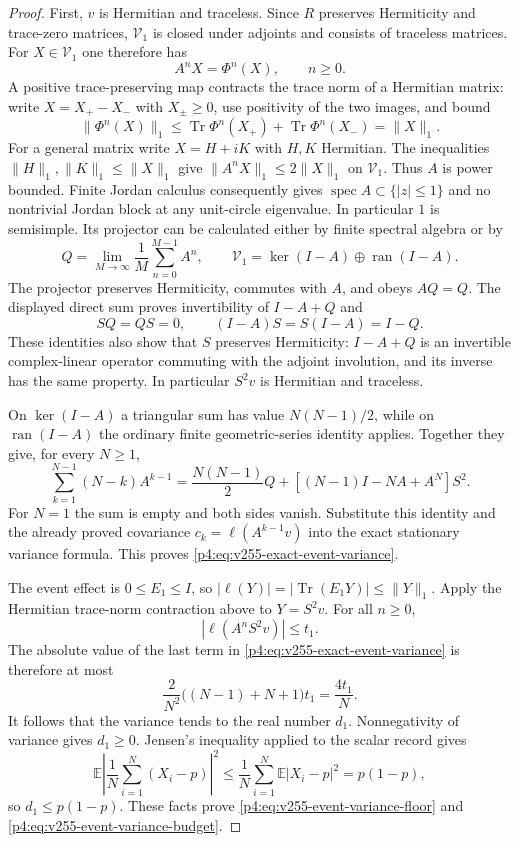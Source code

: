 \documentclass[12pt,a4paper]{article}
\begin{document}
\begin{proof}
First, $v$ is Hermitian and traceless. Since $R$ preserves Hermiticity
and trace-zero matrices, $\mathcal V_1$ is closed under adjoints and
consists of traceless matrices. For $X\in\mathcal V_1$ one therefore has
\[
 A^nX=\Phi^n(X),\qquad n\ge0.
\]
A positive trace-preserving map contracts the trace norm of a Hermitian
matrix: write $X=X_+-X_-$ with $X_\pm\ge0$, use positivity of the two
images, and bound
\[
 \|\Phi^n(X)\|_1
 \le\operatorname{Tr}\Phi^n(X_+)
      +\operatorname{Tr}\Phi^n(X_-)=\|X\|_1.
\]
For a general matrix write $X=H+iK$ with $H,K$ Hermitian. The inequalities
$\|H\|_1,\|K\|_1\le\|X\|_1$ give
$\|A^nX\|_1\le2\|X\|_1$ on $\mathcal V_1$.
Thus $A$ is power bounded. Finite Jordan calculus consequently gives
$\operatorname{spec}A\subset\{|z|\le1\}$ and no nontrivial Jordan
block at any unit-circle eigenvalue. In particular $1$ is semisimple.
Its projector can be calculated either by finite spectral algebra or by
\[
 Q=\lim_{M\to\infty}\frac1M\sum_{n=0}^{M-1}A^n,
 \qquad
 \mathcal V_1=\ker(I-A)\oplus\operatorname{ran}(I-A).
\]
The projector preserves Hermiticity, commutes with $A$, and obeys
$AQ=Q$. The displayed direct sum proves invertibility of $I-A+Q$ and
\[
 SQ=QS=0,\qquad (I-A)S=S(I-A)=I-Q.
\]
These identities also show that $S$ preserves Hermiticity: $I-A+Q$ is
an invertible complex-linear operator commuting with the adjoint
involution, and its inverse has the same property. In particular
$S^2v$ is Hermitian and traceless.

On $\ker(I-A)$ a triangular sum has value $N(N-1)/2$, while on
$\operatorname{ran}(I-A)$ the ordinary finite geometric-series identity
applies. Together they give, for every $N\ge1$,
\[
 \sum_{k=1}^{N-1}(N-k)A^{k-1}
 =\frac{N(N-1)}2Q+
       [(N-1)I-NA+A^N]S^2.
\]
For $N=1$ the sum is empty and both sides vanish. Substitute this
identity and the already proved covariance
$c_k=\ell(A^{k-1}v)$ into the exact stationary variance formula. This
proves \eqref{p4:eq:v255-exact-event-variance}.

The event effect is $0\le E_1\le I$, so
$|\ell(Y)|=|\operatorname{Tr}(E_1Y)|\le\|Y\|_1$. Apply the Hermitian
trace-norm contraction above to $Y=S^2v$. For all $n\ge0$,
\[
 |\ell(A^nS^2v)|\le t_1.
\]
The absolute value of the last term in
\eqref{p4:eq:v255-exact-event-variance} is therefore at most
\[
 \frac2{N^2}\bigl((N-1)+N+1\bigr)t_1=\frac{4t_1}{N}.
\]
It follows that the variance tends to the real number $d_1$.
Nonnegativity of variance gives $d_1\ge0$. Jensen's inequality applied
to the scalar record gives
\[
 \mathbb E\left|\frac1N\sum_{i=1}^N(X_i-p)\right|^2
 \le\frac1N\sum_{i=1}^N\mathbb E|X_i-p|^2=p(1-p),
\]
so $d_1\le p(1-p)$. These facts prove
\eqref{p4:eq:v255-event-variance-floor} and
\eqref{p4:eq:v255-event-variance-budget}.


\end{proof}
\end{document}
